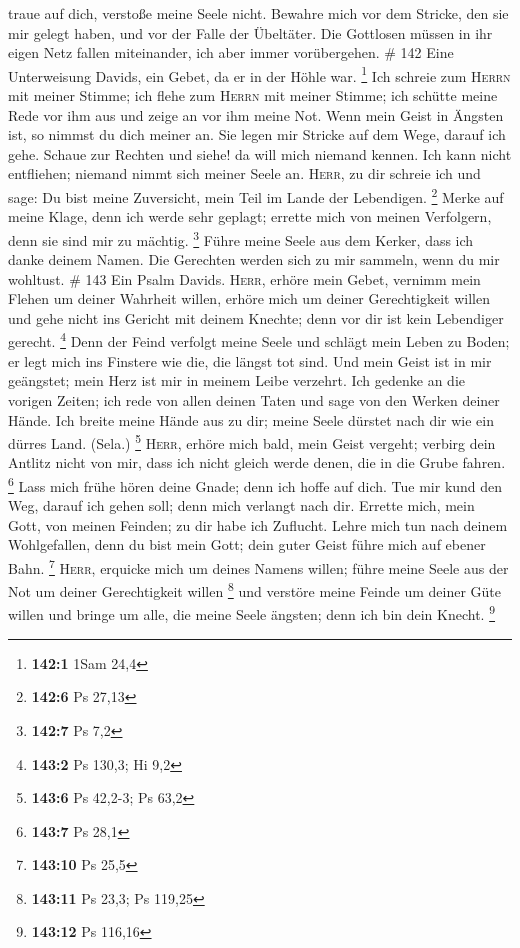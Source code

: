 traue auf dich, verstoße meine Seele nicht.  Bewahre mich
vor dem Stricke, den sie mir gelegt haben, und vor der Falle der
Übeltäter.  Die Gottlosen müssen in ihr eigen Netz fallen
miteinander, ich aber immer vorübergehen. \# 142  Eine
Unterweisung Davids, ein Gebet, da er in der Höhle war. \footnote{\textbf{142:1}
  1Sam 24,4}  Ich schreie zum \textsc{Herrn} mit meiner
Stimme; ich flehe zum \textsc{Herrn} mit meiner Stimme; 
ich schütte meine Rede vor ihm aus und zeige an vor ihm meine Not.
 Wenn mein Geist in Ängsten ist, so nimmst du dich meiner
an. Sie legen mir Stricke auf dem Wege, darauf ich gehe. 
Schaue zur Rechten und siehe! da will mich niemand kennen. Ich kann
nicht entfliehen; niemand nimmt sich meiner Seele an. 
\textsc{Herr}, zu dir schreie ich und sage: Du bist meine Zuversicht,
mein Teil im Lande der Lebendigen. \footnote{\textbf{142:6} Ps 27,13}
 Merke auf meine Klage, denn ich werde sehr geplagt;
errette mich von meinen Verfolgern, denn sie sind mir zu mächtig.
\footnote{\textbf{142:7} Ps 7,2}  Führe meine Seele aus
dem Kerker, dass ich danke deinem Namen. Die Gerechten werden sich zu
mir sammeln, wenn du mir wohltust. \# 143  Ein Psalm
Davids. \textsc{Herr}, erhöre mein Gebet, vernimm mein Flehen um deiner
Wahrheit willen, erhöre mich um deiner Gerechtigkeit willen
 und gehe nicht ins Gericht mit deinem Knechte; denn vor
dir ist kein Lebendiger gerecht. \footnote{\textbf{143:2} Ps 130,3; Hi
  9,2}  Denn der Feind verfolgt meine Seele und schlägt
mein Leben zu Boden; er legt mich ins Finstere wie die, die längst tot
sind.  Und mein Geist ist in mir geängstet; mein Herz ist
mir in meinem Leibe verzehrt.  Ich gedenke an die vorigen
Zeiten; ich rede von allen deinen Taten und sage von den Werken deiner
Hände.  Ich breite meine Hände aus zu dir; meine Seele
dürstet nach dir wie ein dürres Land. (Sela.) \footnote{\textbf{143:6}
  Ps 42,2-3; Ps 63,2}  \textsc{Herr}, erhöre mich bald,
mein Geist vergeht; verbirg dein Antlitz nicht von mir, dass ich nicht
gleich werde denen, die in die Grube fahren. \footnote{\textbf{143:7} Ps
  28,1}  Lass mich frühe hören deine Gnade; denn ich hoffe
auf dich. Tue mir kund den Weg, darauf ich gehen soll; denn mich
verlangt nach dir.  Errette mich, mein Gott, von meinen
Feinden; zu dir habe ich Zuflucht.  Lehre mich tun nach
deinem Wohlgefallen, denn du bist mein Gott; dein guter Geist führe mich
auf ebener Bahn. \footnote{\textbf{143:10} Ps 25,5} 
\textsc{Herr}, erquicke mich um deines Namens willen; führe meine Seele
aus der Not um deiner Gerechtigkeit willen \footnote{\textbf{143:11} Ps
  23,3; Ps 119,25}  und verstöre meine Feinde um deiner
Güte willen und bringe um alle, die meine Seele ängsten; denn ich bin
dein Knecht. \footnote{\textbf{143:12} Ps 116,16}


